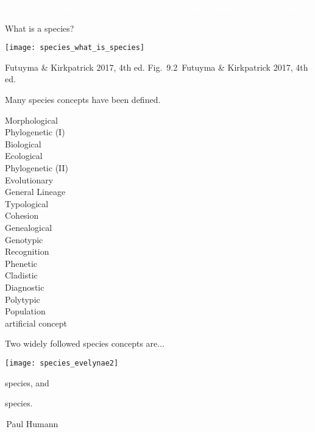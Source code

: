 \documentclass[t]{beamer}
\newcommand{\futuyma}[1]{%
	\ifthenelse{\isempty{#1}}%
	{Futuyma \& Kirkpatrick 2017, 4th ed.}%
	{Fig.~#1~Futuyma \& Kirkpatrick 2017, 4th ed.}%
}
\begin{document}

{
\begin{frame}[b]

\tiny \hfill \textcolor{white}{\futuyma{}}
\end{frame}
}


\begin{frame}{What is a species?}


\texttt{[image: species\_what\_is\_species]}

\tinyfill \futuyma{9.2}

\end{frame}



\begin{frame}{Many species concepts have been defined.}

\vspace{-2\baselineskip}

\hangpara\begin{multicols}{2}
Morphological\\
Phylogenetic (I)\\
Biological\\
Ecological\\
Phylogenetic (II)\\
Evolutionary\\
General Lineage\\
Typological\\
Cohesion\\
Genealogical\\
Genotypic\\
Recognition\\
Phenetic\\
Cladistic\\
Diagnostic\\
Polytypic\\
Population\\[1ex]

artificial concept\\
\end{multicols}
\end{frame}



\begin{frame}{Two widely followed species concepts are$\dots$}


\noindent\begin{multicols}{2}

\vspace{1ex}
\texttt{[image: species\_evelynae2]}

\columnbreak

\hangpara {} species, and

\hangpara {} species.
\end{multicols}

\tinyfill \textcopyright\,Paul Humann

\end{frame}
\end{document}
